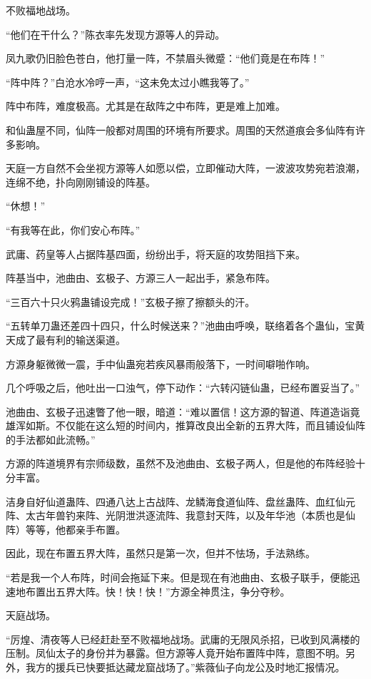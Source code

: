 
\begin{this_body}

不败福地战场。

“他们在干什么？”陈衣率先发现方源等人的异动。

凤九歌仍旧脸色苍白，他打量一阵，不禁眉头微蹙：“他们竟是在布阵！”

“阵中阵？”白沧水冷哼一声，“这未免太过小瞧我等了。”

阵中布阵，难度极高。尤其是在敌阵之中布阵，更是难上加难。

和仙蛊屋不同，仙阵一般都对周围的环境有所要求。周围的天然道痕会多仙阵有许多影响。

天庭一方自然不会坐视方源等人如愿以偿，立即催动大阵，一波波攻势宛若浪潮，连绵不绝，扑向刚刚铺设的阵基。

“休想！”

“有我等在此，你们安心布阵。”

武庸、药皇等人占据阵基四面，纷纷出手，将天庭的攻势阻挡下来。

阵基当中，池曲由、玄极子、方源三人一起出手，紧急布阵。

“三百六十只火鸦蛊铺设完成！”玄极子擦了擦额头的汗。

“五转单刀蛊还差四十四只，什么时候送来？”池曲由呼唤，联络着各个蛊仙，宝黄天成了最有利的输送渠道。

方源身躯微微一震，手中仙蛊宛若疾风暴雨般落下，一时间噼啪作响。

几个呼吸之后，他吐出一口浊气，停下动作：“六转闪链仙蛊，已经布置妥当了。”

池曲由、玄极子迅速瞥了他一眼，暗道：“难以置信！这方源的智道、阵道造诣竟雄浑如斯。不仅能在这么短的时间内，推算改良出全新的五界大阵，而且铺设仙阵的手法都如此流畅。”

方源的阵道境界有宗师级数，虽然不及池曲由、玄极子两人，但是他的布阵经验十分丰富。

洁身自好仙道蛊阵、四通八达上古战阵、龙鳞海食道仙阵、盘丝蛊阵、血红仙元阵、太古年兽钓来阵、光阴泄洪逐流阵、我意封天阵，以及年华池（本质也是仙阵）等等，他都亲手布置。

因此，现在布置五界大阵，虽然只是第一次，但并不怯场，手法熟练。

“若是我一个人布阵，时间会拖延下来。但是现在有池曲由、玄极子联手，便能迅速地布置出五界大阵。快！快！快！”方源全神贯注，争分夺秒。

天庭战场。

“厉煌、清夜等人已经赶赴至不败福地战场。武庸的无限风杀招，已收到风满楼的压制。凤仙太子的身份并为暴露。但方源等人竟开始布置阵中阵，意图不明。另外，我方的援兵已快要抵达藏龙窟战场了。”紫薇仙子向龙公及时地汇报情况。


\end{this_body}
